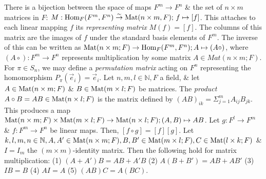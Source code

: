  There is a bijection between the space of maps $F^{m} \to F^{n}$ \& the set of $n \times m$ matrices in $F$: $M : \text{Hom}_{F}(F^{m}, F^{n}) \stackrel{\sim}{\to} \text{Mat}(n \times m, F);\, f \mapsto [f]$. This attaches to each linear mapping $f$ its \emph{representing matrix} $M(f) = [f]$. The columns of this matrix are the images of $f$ under the standard basis elements of $F^{m}$. The inverse of this can be written as $\text{Mat}(n \times m; F) \to \text{Hom}_{F}(F^{m}, F^{n}); A \mapsto (A \circ)$, where $(A \circ) : F^{m} \to F^{n}$ represents multiplication by some matrix $A \in Mat(n \times m; F)$.
 For $\pi \in S_{n}$, we may define a \emph{permutation matrix} acting on $F^n$ representing the homomorphism $P_{\pi}(\vec{e}_{i}) = \vec{e}_{i}$.
 Let $n, m, l \in \mathbb{N}, F$ a field, \& let $A \in \text{Mat}(n \times m; F)$ \& $B \in \text{Mat}(m \times l; F)$ be matrices. The \emph{product} $A \circ B = AB \in \text{Mat}(n \times l; F)$ is the matrix defined by $(AB)_{ik} = \Sigma_{j=1}^{m} A_{ij} B_{jk}$. This produces a map $\text{Mat}(n \times m; F) \times \text{Mat}(m \times l; F) \to \text{Mat}(n \times l; F); (A, B) \mapsto AB$.
 Let $g : F^{l} \to F^{m}$ \& $f : F^{m} \to F^{n}$ be linear maps. Then, $[f \circ g] = [f][g]$.
 Let $k,l,m,n \in \mathbb{N}, A, A' \in \text{Mat}(n \times m; F), B, B' \in \text{Mat}(m \times l; F), C \in \text{Mat}(l \times k; F)$ \& $I = I_{m}$ the $(m \times m)$-identity matrix. Then the following hold for matrix multiplication:
(1) $(A + A')B = AB + A'B$
(2) $A(B + B')= AB + AB'$
(3) $IB = B$
(4) $AI = A$
(5) $(AB)C = A(BC)$.
